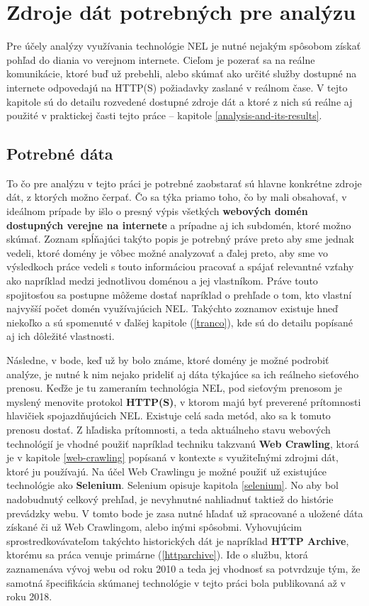 \chapter{Zdroje dát potrebných pre analýzu}
\label{data-sources-available-for-research}

Pre účely analýzy využívania technológie NEL je nutné nejakým spôsobom získať pohľad do diania vo verejnom internete.
Cieľom je pozerať sa na reálne komunikácie, ktoré buď už prebehli, alebo skúmať ako určité služby dostupné na internete
odpovedajú na HTTP(S) požiadavky zaslané v reálnom čase. V tejto kapitole sú do detailu rozvedené dostupné zdroje dát 
a ktoré z nich sú reálne aj použité v praktickej časti tejto práce -- kapitole \ref{analysis-and-its-results}.

\section{Potrebné dáta}

To čo pre analýzu v tejto práci je potrebné zaobstarať sú hlavne konkrétne zdroje dát, z ktorých možno čerpať. Čo sa týka priamo toho,
čo by mali obsahovať, v ideálnom prípade by išlo o presný výpis všetkých \textbf{webových domén dostupných verejne na internete} a prípadne aj ich subdomén, ktoré možno skúmať. 
Zoznam spĺňajúci takýto popis je potrebný práve preto aby sme jednak vedeli, ktoré domény je vôbec možné analyzovať a ďalej preto, aby sme vo výsledkoch práce vedeli s touto informáciou pracovať a spájať relevantné vzťahy ako napríklad medzi jednotlivou doménou a jej vlastníkom. 
Práve touto spojitosťou sa postupne môžeme dostať napríklad o prehľade o tom, kto vlastní najvyšší počet domén využívajúcich NEL. 
Takýchto zoznamov existuje hneď niekoľko a sú spomenuté v ďalšej kapitole (\ref{tranco}), kde sú do detailu popísané aj ich dôležité vlastnosti.

Následne, v bode, keď už by bolo známe, ktoré domény je možné podrobiť analýze, je nutné k nim nejako prideliť aj dáta týkajúce sa ich reálneho sieťového prenosu. 
Keďže je tu zameraním technológia NEL, pod sieťovým prenosom je myslený menovite protokol \textbf{HTTP(S)}, v ktorom majú byť preverené prítomnosti hlavičiek spojazdňujúcich NEL. Existuje celá sada metód, ako sa k tomuto prenosu dostať. 
Z hľadiska prítomnosti, a teda aktuálneho stavu webových technológií je vhodné použiť napríklad techniku takzvanú \textbf{Web Crawling}, ktorá je v kapitole \ref{web-crawling} popísaná v kontexte s využiteľnými zdrojmi dát, ktoré ju používajú.
Na účel Web Crawlingu je možné použiť už existujúce technológie ako \textbf{Selenium}. 
Selenium opisuje kapitola \ref{selenium}.
No aby bol nadobudnutý celkový prehľad, je nevyhnutné nahliadnuť taktiež do histórie prevádzky webu. 
V tomto bode je zasa nutné hľadať už spracované a uložené dáta získané či už Web Crawlingom, alebo inými spôsobmi. 
Vyhovujúcim sprostredkovávateľom takýchto historických dát je napríklad \textbf{HTTP Archive}, ktorému sa práca venuje primárne (\ref{httparchive}).
Ide o službu, ktorá zaznamenáva vývoj webu od roku 2010 a teda jej vhodnosť sa potvrdzuje tým, že samotná špecifikácia skúmanej technológie v tejto práci bola publikovaná až v roku 2018.

